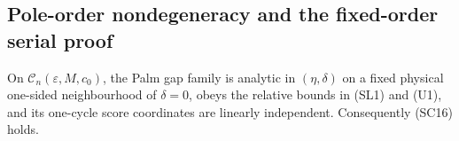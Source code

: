 \subsection{Pole-order nondegeneracy and the fixed-order serial proof}
\label{subsec:serial-pole-order-proof-main}

\begin{lemma}
\label{lem:sampled-double-pole-nondegeneracy-main}
On \(\mathcal C_n(\varepsilon,M,c_0)\), the Palm gap family is analytic in
\((\eta,\delta)\) on a fixed physical one-sided neighbourhood of
\(\delta=0\), obeys the relative bounds in \textup{(SL1)} and \textup{(U1)},
and its one-cycle score coordinates are linearly independent.  Consequently
\textup{(SC16)} holds.
\end{lemma}

